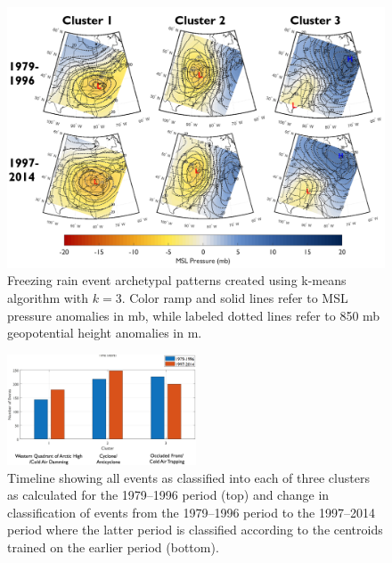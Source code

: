 \documentclass[twocol]{ametsoc}
\begin{document}
\begin{figure}
\centering
\includegraphics[width=\textwidth]{Clusters.PNG}
\caption{\label{fig:clusters} Freezing rain event archetypal patterns created using k-means algorithm with $k=3$. Color ramp and solid lines refer to MSL pressure anomalies in mb, while labeled dotted lines refer to 850 mb geopotential height anomalies in m.}
\end{figure}

\begin{figure}
\centering
\includegraphics[width=0.5\textwidth]{Storm_Pattern_Change.png}
\caption{\label{fig:clusterchange} Timeline showing all events as classified into each of three clusters as calculated for the 1979--1996 period (top) and change in classification of events from the 1979--1996 period to the 1997--2014 period where the latter period is classified according to the centroids trained on the earlier period (bottom).}
\end{figure}
\end{document}
